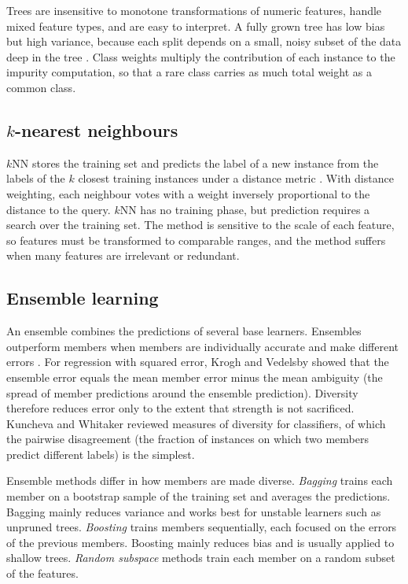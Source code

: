 \documentclass[conference,10pt]{IEEEtran}
\begin{document}
Trees are insensitive to monotone transformations of numeric features, handle mixed feature types, and are easy to interpret. A fully grown tree has low bias but high variance, because each split depends on a small, noisy subset of the data deep in the tree \cite{hastie2009elements}. Class weights multiply the contribution of each instance to the impurity computation, so that a rare class carries as much total weight as a common class.

\subsection{$k$-nearest neighbours}
$k$NN stores the training set and predicts the label of a new instance from the labels of the $k$ closest training instances under a distance metric \cite{cover1967nearest}. With distance weighting, each neighbour votes with a weight inversely proportional to the distance to the query. $k$NN has no training phase, but prediction requires a search over the training set. The method is sensitive to the scale of each feature, so features must be transformed to comparable ranges, and the method suffers when many features are irrelevant or redundant.

\subsection{Ensemble learning}
An ensemble combines the predictions of several base learners. Ensembles outperform members when members are individually accurate and make different errors \cite{dietterich2000ensemble}. For regression with squared error, Krogh and Vedelsby \cite{krogh1995neural} showed that the ensemble error equals the mean member error minus the mean ambiguity (the spread of member predictions around the ensemble prediction). Diversity therefore reduces error only to the extent that strength is not sacrificed. Kuncheva and Whitaker \cite{kuncheva2003measures} reviewed measures of diversity for classifiers, of which the pairwise disagreement (the fraction of instances on which two members predict different labels) is the simplest.

Ensemble methods differ in how members are made diverse. \emph{Bagging} \cite{breiman1996bagging} trains each member on a bootstrap sample of the training set and averages the predictions. Bagging mainly reduces variance and works best for unstable learners such as unpruned trees. \emph{Boosting} \cite{freund1997decision,friedman2001greedy} trains members sequentially, each focused on the errors of the previous members. Boosting mainly reduces bias and is usually applied to shallow trees. \emph{Random subspace} methods \cite{ho1998random} train each member on a random subset of the features.
\end{document}
